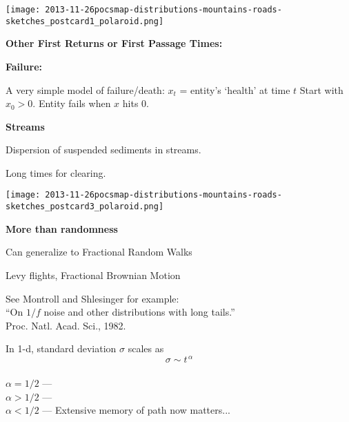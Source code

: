  



  \texttt{[image: 2013-11-26pocsmap-distributions-mountains-roads-sketches\_postcard1\_polaroid.png]}


  \textbf{Other First Returns or First Passage Times:}

  \textbf{Failure:}
    
     A very simple model of failure/death:\cite{weitz2001a}
     $x_t$ = entity's `health' at time $t$
     Start with $x_0 > 0$.
     Entity fails when $x$ hits 0.
    
  

  \bigskip

  \textbf{Streams}
    
    
      Dispersion of suspended sediments in streams.
     
      Long times for clearing.
    
  





  \texttt{[image: 2013-11-26pocsmap-distributions-mountains-roads-sketches\_postcard3\_polaroid.png]}

  \textbf{More than randomness}
  
  
    
    
      Can generalize to Fractional Random Walks\cite{montroll1982a,montroll1983a,montroll1984a}
     
      Levy flights, Fractional Brownian Motion
    
      See Montroll and Shlesinger for example:\cite{montroll1984a}\\
      ``On $1/f$ noise and other distributions with long tails.''\\
      Proc. Natl. Acad. Sci., 1982.
     
      In 1-d, standard deviation $\sigma$ scales as
      $$
      \sigma \sim t^{\, \alpha}
      $$
      \\
      {
        $\alpha = 1/2$ --- 
      }
      \\
      {
        $\alpha > 1/2$ --- 
      }
      \\
      {
        $\alpha < 1/2$ --- 
      }
     Extensive memory of path now matters...
    
